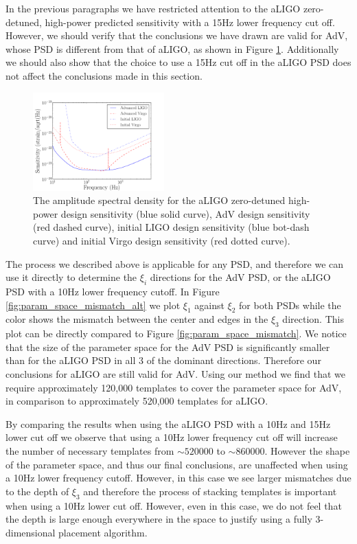 In the previous paragraphs we have restricted attention to the aLIGO
zero-detuned, high-power predicted sensitivity with a 15Hz lower frequency cut off. However,
we should verify that the conclusions we have drawn are valid for AdV, whose
PSD is different from that of aLIGO, as shown in Figure \ref{fig:asd_comparison}. Additionally we
should also show that the choice to use a 15Hz cut off in the aLIGO PSD does not affect
the conclusions made in this section. 
\begin{figure}
\includegraphics[width=0.45\textwidth]{papers/bns_spin/figure6.pdf}
\caption{\label{fig:asd_comparison} The amplitude spectral density for the aLIGO
zero-detuned high-power design sensitivity (blue solid curve), AdV design sensitivity
(red dashed curve), initial LIGO design sensitivity (blue bot-dash curve) and initial
Virgo design sensitivity (red dotted curve).}
\end{figure}


The process we described above is applicable for any PSD, and therefore we can use it directly
to determine the $\xi_i$ directions for the AdV PSD, or the aLIGO PSD with
a 10Hz lower frequency cutoff. In Figure \ref{fig:param_space_mismatch_alt} we plot
$\xi_1$ against $\xi_2$ for both PSDs while the color shows the mismatch between the center and edges in
the $\xi_3$ direction. This plot can be directly compared to Figure \ref{fig:param_space_mismatch}. We notice
that the size of the parameter space for the AdV PSD is significantly smaller than for the
aLIGO PSD in all 3 of the dominant directions. Therefore our conclusions for aLIGO are still
valid for AdV. Using our method we find that we require approximately 120,000 templates to cover the
parameter space for AdV, in comparison to approximately 520,000 templates for aLIGO. 

By comparing the results when using the aLIGO PSD with a 10Hz and 15Hz lower cut off we observe
that using a 10Hz lower frequency cut off will increase the number of necessary templates from $\sim520000$
to $\sim860000$. However the
shape of the parameter space, and thus our final conclusions, are unaffected when using a 10Hz lower
frequency cutoff. However, in this case we see larger mismatches due to the depth of $\xi_3$ and
therefore the process of stacking templates is important when using a 10Hz lower cut off. However, even
in this case, we do
not feel that the depth is large enough everywhere in the space to justify using a fully 3-dimensional placement
algorithm.

